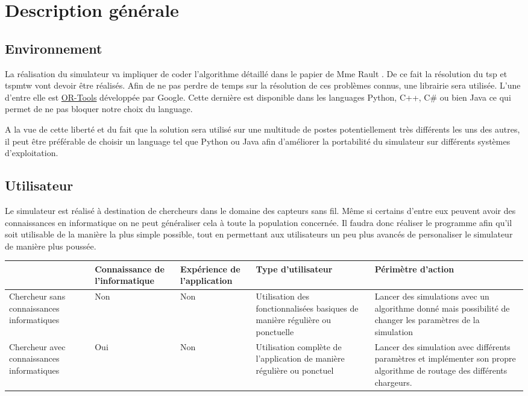 \documentclass[final]{polytech/polytech}
\begin{document}
\chapter{Description générale}
	\section{Environnement}
		La réalisation du simulateur va impliquer de coder l'algorithme détaillé dans le papier de Mme Rault \cite{Rault:chargers}.
		De ce fait la résolution du \gls{tsp} et \gls{tspmtw} vont devoir être réalisés.
		Afin de ne pas perdre de temps sur la résolution de ces problèmes connus, une librairie sera utilisée.
		L'une d'entre elle est \href{https://developers.google.com/optimization/}{OR-Tools} développée par Google.
		Cette dernière est disponible dans les languages Python, C++, C\# ou bien Java ce qui permet de ne pas bloquer notre choix du language.
		
		A la vue de cette liberté et du fait que la solution sera utilisé sur une multitude de postes potentiellement très différents les uns des autres, il peut être préférable de choisir un language tel que Python ou Java afin d'améliorer la portabilité du simulateur sur différents systèmes d'exploitation.
	
	\section{Utilisateur\label{sec:users}}
		Le simulateur est réalisé à destination de chercheurs dans le domaine des capteurs sans fil.
		Même si certains d'entre eux peuvent avoir des connaissances en informatique on ne peut généraliser cela à toute la population concernée.
		Il faudra donc réaliser le programme afin qu'il soit utilisable de la manière la plus simple possible, tout en permettant aux utilisateurs un peu plus avancés de personaliser le simulateur de manière plus poussée.
		
		\begin{center}
			\centering
			\begin{tabularx}{\textwidth}{|X||X|X|X|X|}
				\hline
				& Connaissance de l'informatique & Expérience de l'application & Type d'utilisateur & Périmètre d'action\\\hline\hline
				Chercheur sans connaissances informatiques & Non & Non & Utilisation des fonctionnalisées basiques de manière régulière ou ponctuelle & Lancer des simulations avec un algorithme donné mais possibilité de changer les paramètres de la simulation\\\hline
				Chercheur avec connaissances informatiques & Oui & Non & Utilisation complète de l'application de manière régulière ou ponctuel & Lancer des simulation avec différents paramètres et implémenter son propre algorithme de routage des différents chargeurs.\\\hline
			\end{tabularx}
		\end{center}
\end{document}
